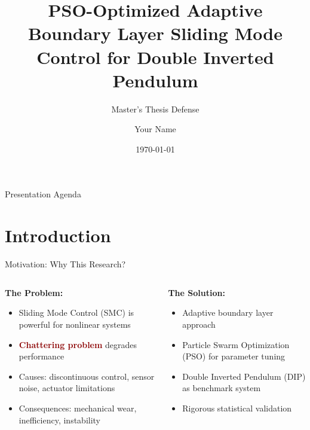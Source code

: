 \documentclass[10pt,aspectratio=169]{beamer}
\title{PSO-Optimized Adaptive Boundary Layer Sliding Mode Control for Double Inverted Pendulum}
\subtitle{Master's Thesis Defense}
\author{Your Name}
\institute{Your University\\Department of Control Engineering}
\date{\today}
\newcommand{\emphred}[1]{\textcolor{darkred}{\textbf{#1}}}
\begin{document}
\frame{\titlepage}

\begin{frame}{Presentation Agenda}
\tableofcontents
\end{frame}

\section{Introduction}

\begin{frame}{Motivation: Why This Research?}
\begin{columns}
\begin{column}{0.5\textwidth}
\textbf{The Problem:}
\begin{itemize}
    \item Sliding Mode Control (SMC) is powerful for nonlinear systems
    \item \emphred{Chattering problem} degrades performance
    \item Causes: discontinuous control, sensor noise, actuator limitations
    \item Consequences: mechanical wear, inefficiency, instability
\end{itemize}
\end{column}
\begin{column}{0.5\textwidth}
\textbf{The Solution:}
\begin{itemize}
    \item Adaptive boundary layer approach
    \item Particle Swarm Optimization (PSO) for parameter tuning
    \item Double Inverted Pendulum (DIP) as benchmark system
    \item Rigorous statistical validation
\end{itemize}
\end{column}
\end{columns}
\vspace{0.5cm}
\centering
{}
\end{frame}
\end{document}

